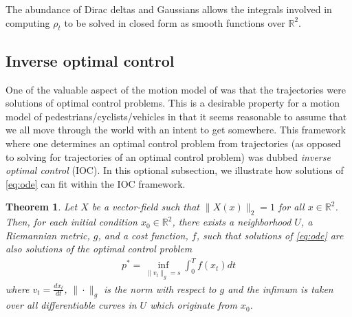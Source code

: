 \documentclass[conference]{IEEEtran}
\newtheorem{thm}{Theorem}
\begin{document}

The abundance of Dirac deltas and Gaussians allows the integrals involved in computing $\rho_t$ to be solved in closed form
as smooth functions over $\mathbb{R}^2$.

\subsection{Inverse optimal control}
One of the valuable aspect of the motion model of \cite{Kitani2012} was that the trajectories were solutions of optimal control problems.
This is a desirable property for a motion model of pedestrians/cyclists/vehicles in that it seems reasonable to assume that we all move through the world with an intent to get somewhere.
This framework where one determines an optimal control problem from trajectories (as opposed to solving for trajectories of an optimal control problem) was dubbed \emph{inverse optimal control} (IOC).
In this optional subsection, we illustrate how solutions of \ref{eq:ode} can fit within the IOC framework.

\begin{thm}
	Let $X$ be a vector-field such that $\| X(x) \|_2 = 1$ for all $x \in \mathbb{R}^2$.
Then, for each initial condition $x_0 \in \mathbb{R}^2$, there exists a neighborhood $U$, a Riemannian metric, $g$, and a cost function, $f$, 
such that solutions of \eqref{eq:ode} are also solutions of the optimal control problem
\begin{align}
	p^* = \inf_{ \| v_t \|_g = s } \int_0^T f( x_t) dt \label{eq:IOC}
\end{align}
where $v_t = \frac{d x_t}{dt}$, $\| \cdot \|_g$ is the norm with respect to $g$ and the infimum is taken over all differentiable curves in $U$ which originate from $x_0$.
\end{thm}
\end{document}
